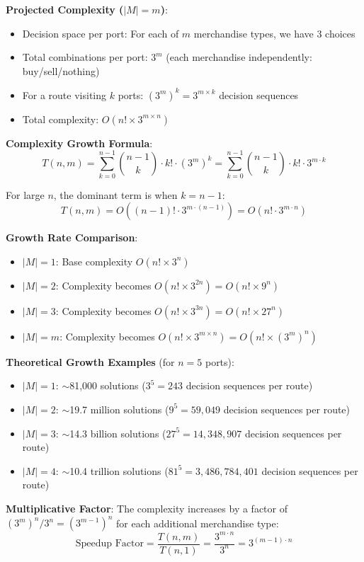 \documentclass[12pt]{article}
\begin{document}
\textbf{Projected Complexity ($|M| = m$)}:
\begin{itemize}
    \item Decision space per port: For each of $m$ merchandise types, we have 3 choices
    \item Total combinations per port: $3^m$ (each merchandise independently: buy/sell/nothing)
    \item For a route visiting $k$ ports: $(3^m)^k = 3^{m \times k}$ decision sequences
    \item Total complexity: $O(n! \times 3^{m \times n})$
\end{itemize}

\textbf{Complexity Growth Formula}:
\[
T(n, m) = \sum_{k=0}^{n-1} \binom{n-1}{k} \cdot k! \cdot (3^m)^k = \sum_{k=0}^{n-1} \binom{n-1}{k} \cdot k! \cdot 3^{m \cdot k}
\]

For large $n$, the dominant term is when $k = n-1$:
\[
T(n, m) = O((n-1)! \cdot 3^{m \cdot (n-1)}) = O(n! \cdot 3^{m \cdot n})
\]

\textbf{Growth Rate Comparison}:
\begin{itemize}
    \item $|M| = 1$: Base complexity $O(n! \times 3^n)$
    \item $|M| = 2$: Complexity becomes $O(n! \times 3^{2n}) = O(n! \times 9^n)$
    \item $|M| = 3$: Complexity becomes $O(n! \times 3^{3n}) = O(n! \times 27^n)$
    \item $|M| = m$: Complexity becomes $O(n! \times 3^{m \times n}) = O(n! \times (3^m)^n)$
\end{itemize}

\textbf{Theoretical Growth Examples} (for $n=5$ ports):
\begin{itemize}
    \item $|M| = 1$: $\sim$81,000 solutions ($3^5 = 243$ decision sequences per route)
    \item $|M| = 2$: $\sim$19.7 million solutions ($9^5 = 59,049$ decision sequences per route)
    \item $|M| = 3$: $\sim$14.3 billion solutions ($27^5 = 14,348,907$ decision sequences per route)
    \item $|M| = 4$: $\sim$10.4 trillion solutions ($81^5 = 3,486,784,401$ decision sequences per route)
\end{itemize}

\textbf{Multiplicative Factor}:
The complexity increases by a factor of $(3^m)^n / 3^n = (3^{m-1})^n$ for each additional merchandise type:
\[
\text{Speedup Factor} = \frac{T(n, m)}{T(n, 1)} = \frac{3^{m \cdot n}}{3^n} = 3^{(m-1) \cdot n}
\]
\end{document}
